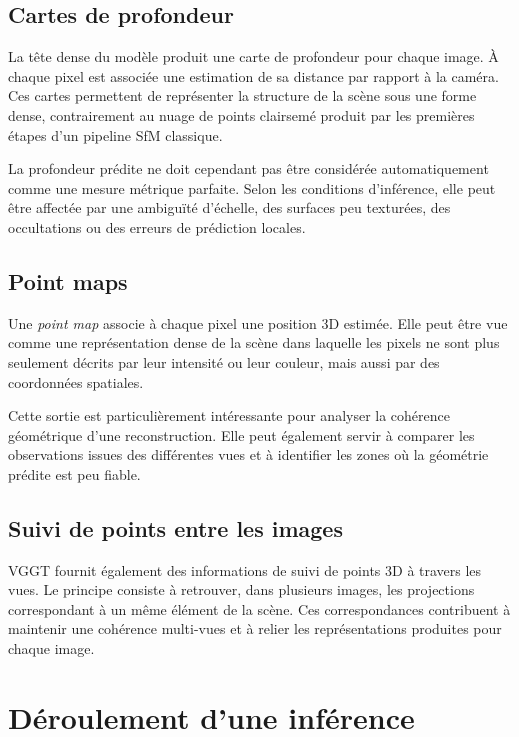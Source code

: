 \documentclass[12pt,a4paper,oneside]{report}
\begin{document}
\subsection{Cartes de profondeur}

La tête dense du modèle produit une carte de profondeur pour chaque image. À chaque pixel est associée une estimation de sa distance par rapport à la caméra. Ces cartes permettent de représenter la structure de la scène sous une forme dense, contrairement au nuage de points clairsemé produit par les premières étapes d'un pipeline SfM classique.

La profondeur prédite ne doit cependant pas être considérée automatiquement comme une mesure métrique parfaite. Selon les conditions d'inférence, elle peut être affectée par une ambiguïté d'échelle, des surfaces peu texturées, des occultations ou des erreurs de prédiction locales.

\subsection{Point maps}

Une \textit{point map} associe à chaque pixel une position 3D estimée. Elle peut être vue comme une représentation dense de la scène dans laquelle les pixels ne sont plus seulement décrits par leur intensité ou leur couleur, mais aussi par des coordonnées spatiales.

Cette sortie est particulièrement intéressante pour analyser la cohérence géométrique d'une reconstruction. Elle peut également servir à comparer les observations issues des différentes vues et à identifier les zones où la géométrie prédite est peu fiable.

\subsection{Suivi de points entre les images}

VGGT fournit également des informations de suivi de points 3D à travers les vues. Le principe consiste à retrouver, dans plusieurs images, les projections correspondant à un même élément de la scène. Ces correspondances contribuent à maintenir une cohérence multi-vues et à relier les représentations produites pour chaque image.

\section{Déroulement d'une inférence}
\end{document}
